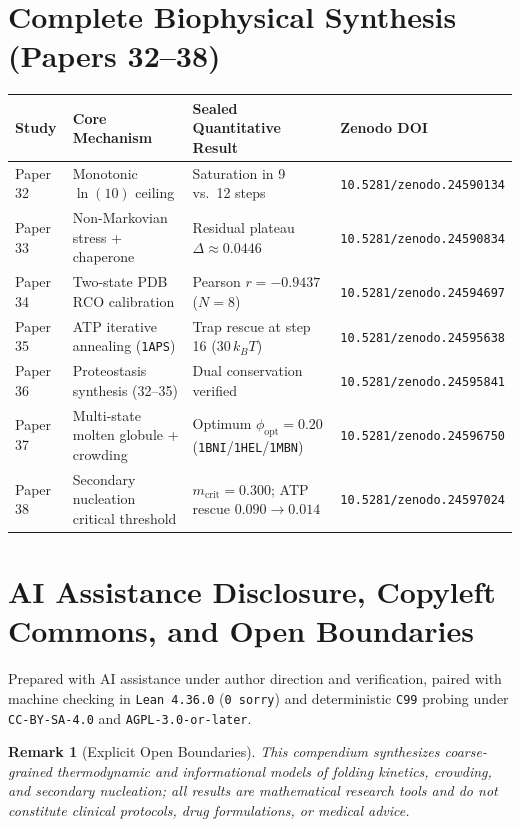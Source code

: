\documentclass[11pt,a4paper]{article}
\newtheorem{remark}{Remark}
\begin{document}
\section{Complete Biophysical Synthesis (Papers 32--38)}
\begin{center}
\small
\begin{tabular}{llp{5.2cm}l}
\toprule
\textbf{Study} & \textbf{Core Mechanism} & \textbf{Sealed Quantitative Result} & \textbf{Zenodo DOI} \\
\midrule
Paper 32 & Monotonic $\ln(10)$ ceiling & Saturation in 9 vs.\ 12 steps & \texttt{10.5281/zenodo.24590134} \\
Paper 33 & Non-Markovian stress + chaperone & Residual plateau $\Delta \approx 0.0446$ & \texttt{10.5281/zenodo.24590834} \\
Paper 34 & Two-state PDB $\mathrm{RCO}$ calibration & Pearson $r = -0.9437$ ($N=8$) & \texttt{10.5281/zenodo.24594697} \\
Paper 35 & ATP iterative annealing (\texttt{1APS}) & Trap rescue at step 16 ($30\,k_B T$) & \texttt{10.5281/zenodo.24595638} \\
Paper 36 & Proteostasis synthesis (32--35) & Dual conservation verified & \texttt{10.5281/zenodo.24595841} \\
Paper 37 & Multi-state molten globule + crowding & Optimum $\phi_{\mathrm{opt}} = 0.20$ (\texttt{1BNI}/\texttt{1HEL}/\texttt{1MBN}) & \texttt{10.5281/zenodo.24596750} \\
Paper 38 & Secondary nucleation critical threshold & $m_{\mathrm{crit}} = 0.300$; ATP rescue $0.090 \to 0.014$ & \texttt{10.5281/zenodo.24597024} \\
\bottomrule
\end{tabular}
\end{center}

\section*{AI Assistance Disclosure, Copyleft Commons, and Open Boundaries}
Prepared with AI assistance under author direction and verification, paired with machine checking in \texttt{Lean~4.36.0} (\texttt{0~sorry}) and deterministic \texttt{C99} probing under \texttt{CC-BY-SA-4.0} and \texttt{AGPL-3.0-or-later}.

\begin{remark}[Explicit Open Boundaries]
This compendium synthesizes coarse-grained thermodynamic and informational models of folding kinetics, crowding, and secondary nucleation; all results are mathematical research tools and do not constitute clinical protocols, drug formulations, or medical advice.
\end{remark}
\end{document}
